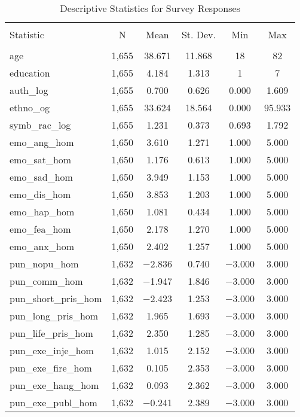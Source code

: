 
\begin{table}[H] \centering 
  \caption{Descriptive Statistics for Survey Responses} 
  \label{} 
\begin{tabular}{@{\extracolsep{5pt}}lccccc} 
\\[-1.8ex]\hline 
\hline \\[-1.8ex] 
Statistic & \multicolumn{1}{c}{N} & \multicolumn{1}{c}{Mean} & \multicolumn{1}{c}{St. Dev.} & \multicolumn{1}{c}{Min} & \multicolumn{1}{c}{Max} \\ 
\hline \\[-1.8ex] 
age & 1,655 & 38.671 & 11.868 & 18 & 82 \\ 
education & 1,655 & 4.184 & 1.313 & 1 & 7 \\ 
auth\_log & 1,655 & 0.700 & 0.626 & 0.000 & 1.609 \\ 
ethno\_og & 1,655 & 33.624 & 18.564 & 0.000 & 95.933 \\ 
symb\_rac\_log & 1,655 & 1.231 & 0.373 & 0.693 & 1.792 \\ 
emo\_ang\_hom & 1,650 & 3.610 & 1.271 & 1.000 & 5.000 \\ 
emo\_sat\_hom & 1,650 & 1.176 & 0.613 & 1.000 & 5.000 \\ 
emo\_sad\_hom & 1,650 & 3.949 & 1.153 & 1.000 & 5.000 \\ 
emo\_dis\_hom & 1,650 & 3.853 & 1.203 & 1.000 & 5.000 \\ 
emo\_hap\_hom & 1,650 & 1.081 & 0.434 & 1.000 & 5.000 \\ 
emo\_fea\_hom & 1,650 & 2.178 & 1.270 & 1.000 & 5.000 \\ 
emo\_anx\_hom & 1,650 & 2.402 & 1.257 & 1.000 & 5.000 \\ 
pun\_nopu\_hom & 1,632 & $-$2.836 & 0.740 & $-$3.000 & 3.000 \\ 
pun\_comm\_hom & 1,632 & $-$1.947 & 1.846 & $-$3.000 & 3.000 \\ 
pun\_short\_pris\_hom & 1,632 & $-$2.423 & 1.253 & $-$3.000 & 3.000 \\ 
pun\_long\_pris\_hom & 1,632 & 1.965 & 1.693 & $-$3.000 & 3.000 \\ 
pun\_life\_pris\_hom & 1,632 & 2.350 & 1.285 & $-$3.000 & 3.000 \\ 
pun\_exe\_inje\_hom & 1,632 & 1.015 & 2.152 & $-$3.000 & 3.000 \\ 
pun\_exe\_fire\_hom & 1,632 & 0.105 & 2.353 & $-$3.000 & 3.000 \\ 
pun\_exe\_hang\_hom & 1,632 & 0.093 & 2.362 & $-$3.000 & 3.000 \\ 
pun\_exe\_publ\_hom & 1,632 & $-$0.241 & 2.389 & $-$3.000 & 3.000 \\ 

\end{tabular}
\end{table}
